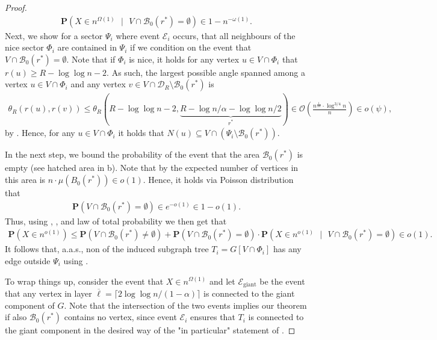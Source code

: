 \documentclass[letterpaper,11pt]{article}
\newcommand{\Prob}[1]{\mathbf{P}\left(#1\right)}
\newcommand{\aas}{a.a.s.\xspace}
\newcommand{\B}{\mathcal B}
\newcommand{\1}{\mathbb I}
\newcommand{\bigO}{\mathcal{O}}
\begin{document}
\begin{proof}
%
\begin{align}\label{eq:X-concentration}
\Prob{X \in n^{\Omega(1)} \text{ }|\text{ }V \cap \B_0(r^*) = \emptyset} \in 1 - n^{-\omega(1)}.    
\end{align}
%
Next, we show for a sector $\Psi_i$ where event $\mathcal{E}_i$ occurs, that all neighbours of the nice sector $\Phi_i$ are contained in $\Psi_i$ if we condition on the event that $V \cap \B_0(r^*) = \emptyset$. Note that if $\Phi_i$ is nice, it holds for any vertex $u \in V \cap \Phi_i$ that $r(u) \geq R - \log\log n -2$. As such, the largest possible angle spanned among a vertex $u \in V \cap \Phi_i$ and any vertex $v \in V \cap \mathcal{D}_R\setminus\B_0(r^*)$ is
%
\begin{align}\label{eq:angle-neighbour-bound}
\theta_R(r(u), r(v)) \leq \theta_R(R - \log\log n - 2, \underbrace{R - \log n/\alpha - \log\log n /2}_{r^*}) \in \bigO\left(\frac{n^{\frac{1}{2\alpha}}\cdot \log^{3/4}n}{n}\right) \in o(\psi),   
\end{align}
%
by . Hence, for any $u \in V \cap \Phi_i$ it holds that $N(u) \subseteq V \cap (\Psi_i\setminus \B_0(r^*))$.

In the next step, we bound the probability of the event that the area $\B_0(r^*)$ is empty (see hatched area in b). Note that by  the expected number of vertices in this area is $n\cdot\mu(B_0(r^*)) \in o(1)$. Hence, it holds via Poisson distribution that
%
\begin{align}\label{eq:empty-inner-disk}
   \Prob{V \cap \B_0(r^*) = \emptyset} \in e^{-o(1)} \in 1 - o(1).
\end{align}
%
Thus, using , , and law of total probability we then get that
%
\begin{align}\label{eq:X-concentration2}
\Prob{X \in n^{o(1)}} \leq \Prob{V \cap \B_0(r^*) \neq \emptyset} + \Prob{V \cap \B_0(r^*) = \emptyset}\cdot \Prob{X \in n^{o(1)} \text{ }|\text{ }V \cap \B_0(r^*) = \emptyset} \in o(1).    
\end{align}
%
It follows that, \aas, non of the induced subgraph tree $T_i = G[V \cap \Phi_i]$ has any edge outside $\Psi_i$ using .

To wrap things up, consider the event that $X \in n^{\Omega(1)}$ and let $\mathcal{E}_{\text{giant}}$ be the event that any vertex in layer $\overline{\ell} =\lceil 2\log\log n/(1-\alpha)\rceil$ is connected to the giant component of $G$. Note that the intersection of the two events implies our theorem if also $\B_0(r^*)$ contains no vertex, since event $\mathcal{E}_i$ ensures that $T_i$ is connected to the giant component in the desired way of the "in particular" statement of .


\end{proof}
\end{document}
